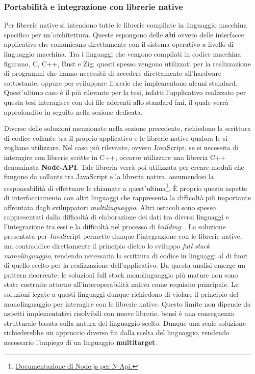 \subsubsection{Portabilità e integrazione con librerie native}
\label{subsec:background-fullstack-gap}
Per librerie native si intendono tutte le librerie compilate in linguaggio macchina specifico per un'architettura. Queste espongono delle \textbf{\ac{abi}} ovvero delle interfacce applicative che comunicano direttamente con il sistema operativo a livello di linguaggio macchina.
Tra i linguaggi che vengono compilati in codice macchina figurano, C, C++, Rust e Zig; questi spesso vengono utilizzati per la realizzazione di programmi che hanno necessità di accedere direttamente all'hardware sottostante, oppure per sviluppare librerie che implementano alcuni standard. Quest'ultimo caso è il più rilevante per la tesi, infatti l'applicativo realizzato per questa tesi interagisce con dei file aderenti allo standard \ac{fmi}, il quale verrà approfondito in seguito nella sezione dedicata.

Diverse delle soluzioni menzionate nella sezione precedente, richiedono la scrittura di codice collante tra il proprio applicativo e le librerie native qualora le si vogliano utilizzare.
Nel caso più rilevante, ovvero JavaScript, se si necessita di interagire con librerie scritte in C++, occorre utilizzare una libreria C++ denominata \textbf{Node-API}. Tale libreria verrà poi utilizzata per creare moduli che fungono da collante tra JavaScript e la libreria nativa, assumendosi la responsabilità di effettuare le chiamate a quest'ultima\footnote{\href{https://nodejs.org/api/n-api.html\#node-api}{Documentazione di Node.js per N-Api.}}.
È proprio questo aspetto di interfacciamento con altri linguaggi che rappresenta la difficoltà più importante affrontata dagli sviluppatori \textit{multilinguaggio}. Altri ostacoli sono spesso rappresentati dalla difficoltà di elaborazione dei dati tra diversi linguaggi e l'integrazione tra essi e la difficoltà nel processo di \textit{building}~\cite{DBLP:conf/icse/YangLWC23}.
La soluzione presentata per JavaScript permette dunque l'integrazione con le librerie native, ma contraddice direttamente il principio dietro lo sviluppo \textit{full stack monolinguaggio}, rendendo necessaria la scrittura di codice in linguaggi al di fuori di quello scelto per la realizzazione dell'applicativo.
Da questa analisi emerge un pattern ricorrente: le soluzioni full stack monolinguaggio più mature non sono state costruite attorno all'interoperabilità nativa come requisito principale.
Le soluzioni legate a questi linguaggi dunque richiedono di violare il principio del monolinguaggio per interagire con le librerie native.
Questo limite non dipende da aspetti implementativi risolvibili con nuove librerie, bensì è una conseguenza strutturale basata sulla natura del linguaggio scelto.
Dunque una reale soluzione richiederebbe un approccio diverso fin dalla scelta del linguaggio, rendendo necessario l'impiego di un linguaggio \textbf{multitarget}.

